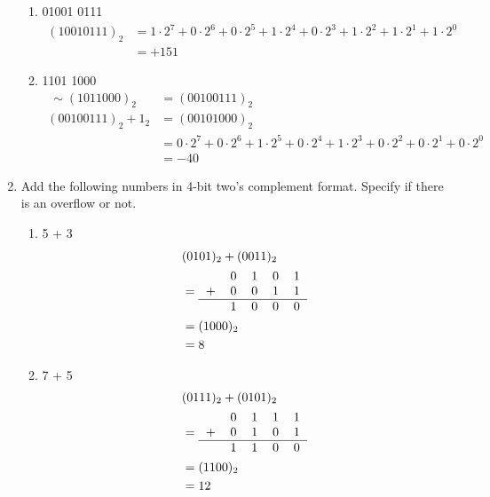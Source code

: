 \documentclass[12pt]{article}
\begin{document}
\begin{enumerate}
    \begin{enumerate}
      \item 01001 0111
      \begin{align*}
        (1001 0111)_2 &= 1 \cdot 2^7 + 0 \cdot 2^6 + 0 \cdot 2^5 + 1 \cdot 2^4 + 0 \cdot 2^3 + 1 \cdot 2^2 + 1 \cdot 2^1 + 1 \cdot 2^0 \\
        &= +151
      \end{align*}

      \item 1101 1000
      \begin{align*}
        \ \sim(101 1000)_2 &= (0010 0111)_2 \\
        (0010 0111)_2 + 1_2 &= (0010 1000)_2 \\
        &= 0 \cdot 2^7 + 0 \cdot 2^6 + 1 \cdot 2^5 + 0 \cdot 2^4 + 1 \cdot 2^3 + 0 \cdot 2^2 + 0 \cdot 2^1 + 0 \cdot 2^0 \\
        &= -40
      \end{align*}

    \end{enumerate}

    \item Add the following numbers in 4-bit two’s complement format. Specify if there is an overflow or not.

    \begin{enumerate}
      \item 5 + 3
      \begin{align*}
        & (0101)_2 + (0011)_2 \\
        &= \begin{tabular}{ccccc}
          & 0 & 1 & 0 & 1 \\
        + & 0 & 0 & 1 & 1 \\
        \hline
          & 1 & 0 & 0 & 0 \\
        \end{tabular} \\
        &= (1000)_2 \\
        &= 8
      \end{align*}

      \item 7 + 5
      \begin{align*}
        & (0111)_2 + (0101)_2 \\
        &= \begin{tabular}{ccccc}
          & 0 & 1 & 1 & 1 \\
        + & 0 & 1 & 0 & 1 \\
        \hline
          & 1 & 1 & 0 & 0 \\
        \end{tabular} \\
        &= (1100)_2 \\
        &= 12
      \end{align*}


\end{enumerate}
\end{enumerate}
\end{document}
